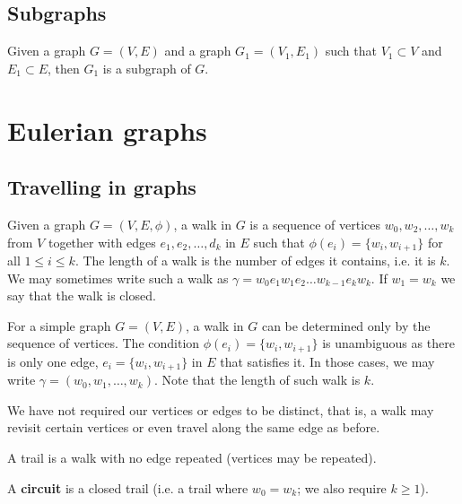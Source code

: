 \documentclass[10pt, a4paper]{article}
\begin{document}
\subsection{Subgraphs}

\begin{definition}
    Given a graph $G = (V, E)$ and a graph $G_1 = (V_1, E_1)$ such that $V_1 \subset V$ and $E_1 \subset E$,
    then $G_1$ is a subgraph of $G$.
\end{definition}

\newpage

\section{Eulerian graphs}

\subsection{Travelling in graphs}
\begin{definition}[Walk]
    Given a graph $G = (V, E, \phi)$,
    a walk in $G$ is a sequence of vertices $w_0, w_2, \dotsc, w_k$ from $V$ together with edges $e_1, e_2, \dotsc, d_k$ in $E$ such that $\phi(e_i) = \{w_i, w_{i + 1}\}$ for all $1 \leq i \leq k$.
    The length of a walk is the number of edges it contains,
    i.e. it is $k$.
    We may sometimes write such a walk as $\gamma = w_0e_1w_1e_2\dotsc w_{k - 1}e_kw_k$.
    If $w_1 = w_k$ we say that the walk is closed.
\end{definition}

\begin{remark}
    For a simple graph $G = (V, E)$,
    a walk in $G$ can be determined only by the sequence of vertices.
    The condition $\phi(e_i) = \{w_i, w_{i + 1}\}$ is unambiguous as there is only one edge,
    $e_i = \{w_i, w_{i + 1}\}$ in $E$ that satisfies it.
    In those cases,
    we may write $\gamma = (w_0, w_1, \dotsc, w_k)$.
    Note that the length of such walk is $k$.
\end{remark}

We have not required our vertices or edges to be distinct,
that is,
a walk may revisit certain vertices or even travel along the same edge as before.

\begin{definition}[Trail]
    A trail is a walk with no edge repeated
    (vertices may be repeated).
\end{definition}

A \textbf{circuit} is a closed trail
(i.e.
a trail where $w_0 = w_k$;
we also require $k \geq 1$).
\end{document}
